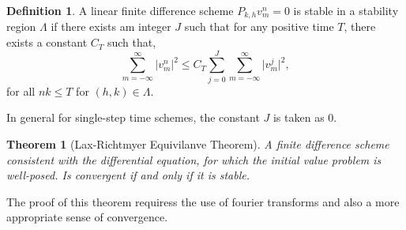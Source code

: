 \documentclass[12pt]{article}
\newtheorem{theorem}{Theorem}
\theoremstyle{definition}
\newtheorem{definition}{Definition}
\begin{document}
\begin{definition}
A linear finite difference scheme $P_{k,h}v_m^n=0$ is stable in a stability region $\Lambda$ if there exists am integer $J$ such that for any positive time $T$, there exists a constant $C_T$ such that,
\begin{equation}
\sum_{m=-\infty}^{\infty} \lvert v_m^n\rvert^2 \leq C_T \sum_{j=0}^J\sum_{m=-\infty}^{\infty}\lvert v_m^j\rvert^2,
\end{equation} 
for all $nk\leq T$ for $(h,k)\in \Lambda$.
\end{definition}
In general for single-step time schemes, the constant $J$ is taken as $0$.

\begin{theorem}[Lax-Richtmyer Equivilanve Theorem]
A finite difference scheme consistent with the differential equation, for which the initial value problem is well-posed. Is convergent if and only if it is stable.
\end{theorem}
The proof of this theorem requiress the use of fourier transforms and also a more appropriate sense of convergence.\\
\end{document}
